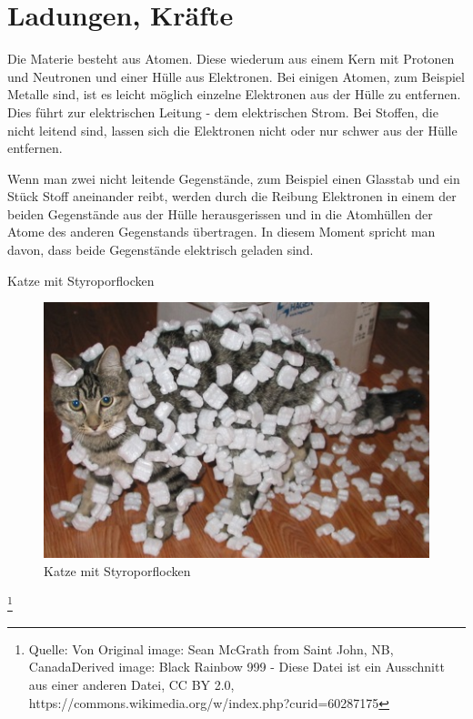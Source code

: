 \documentclass[aspectratio=169, ignorenonframetext]{beamer}
\begin{document}
\section{Ladungen, Kräfte}
Die Materie besteht aus Atomen. Diese wiederum aus einem Kern mit Protonen und Neutronen und einer Hülle aus Elektronen. Bei einigen Atomen, zum Beispiel Metalle sind, ist es leicht möglich einzelne Elektronen aus der Hülle zu entfernen. Dies führt zur elektrischen Leitung - dem elektrischen Strom. Bei Stoffen, die nicht leitend sind, lassen sich die Elektronen nicht oder nur schwer aus der Hülle entfernen.

Wenn man zwei nicht leitende Gegenstände, zum Beispiel einen Glasstab und ein Stück Stoff aneinander reibt, werden durch die Reibung Elektronen in einem der beiden Gegenstände aus der Hülle herausgerissen und in die Atomhüllen der Atome des anderen Gegenstands übertragen. In diesem Moment spricht man davon, dass beide Gegenstände elektrisch geladen sind.
\begin{frame}{Katze mit Styroporflocken}
  \begin{figure}[htb]
    \includegraphics{Cat_demonstrating_static_cling_with_styrofoam_peanuts.jpeg}
    \caption{Katze mit Styroporflocken}
    \label{abb:CatWidthStyropor}
    \end{figure}
  \footnote{Quelle: Von Original image: Sean McGrath from Saint John, NB, CanadaDerived image: Black Rainbow 999 - Diese Datei ist ein Ausschnitt aus einer anderen Datei, CC BY 2.0, https://commons.wikimedia.org/w/index.php?curid=60287175}
\end{frame}
\end{document}
